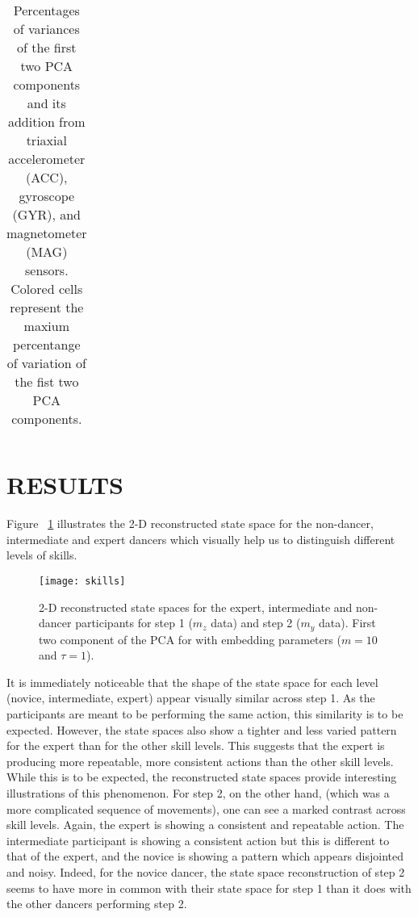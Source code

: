 \documentclass{sigchi}
\begin{document}
\begin{table}
\begin{tabular}{l c c c c c c }
\bottomrule
\end{tabular}

  \caption{Percentages of variances of the first two PCA components and its addition
       from triaxial accelerometer (ACC), gyroscope (GYR), and magnetometer (MAG) sensors.
  Colored cells represent the maxium percentange of variation of the fist two PCA components.}
  \label{tab:table2}
\end{table}



\section{RESULTS}
Figure ~\ref{fig:skills} illustrates the 2-D reconstructed state space for the 
non-dancer, intermediate and expert dancers which visually help us to distinguish different levels of skills. 
\begin{figure}[htbp!] 
  \centering    
  \texttt{[image: skills]}
  \caption[PA]{2-D reconstructed state spaces for the expert, intermediate and 
  non-dancer participants for step 1 ($m_z$ data) and step 2 ($m_y$ data). 
  First two component of the PCA for with embedding parameters ($m = 10$ and $\tau = 1$).}
  \label{fig:skills}
  \end{figure}
It is immediately noticeable that the shape of the state space for each level (novice, intermediate, expert) 
appear visually similar across step 1.  
As the participants are meant to be performing the same action, this similarity is to be expected.  
However, the state spaces also show a tighter and less varied pattern for the expert than for the other skill levels.  
This suggests that the expert is producing more repeatable, more consistent actions than the other skill levels.  
While this is to be expected, the reconstructed state spaces provide interesting illustrations of this phenomenon.  
For step 2, on the other hand, (which was a more complicated sequence of movements),
one can see a marked contrast across skill levels.  
Again, the expert is showing a consistent and repeatable action.  
The intermediate participant is showing a consistent action but this is different to that of the expert, 
and the novice is showing a pattern which appears disjointed and noisy.  
Indeed, for the novice dancer, the state space reconstruction of step 2 seems to have more in common 
with their state space for step 1 than it does with the other dancers performing step 2.  
\end{document}
